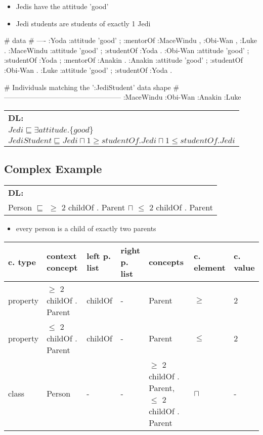 \documentclass{llncs}
\newenvironment{gcotable}{
  \scriptsize
  \sffamily
  \vspace{0.3cm}
  \begin{tabular}{l|l|l|l|l|l|l}
  \hline
  \textbf{c. type} & \textbf{context concept} & \textbf{left p. list} & \textbf{right p. list} & \textbf{concepts} & \textbf{c. element} & \textbf{c. value} \\
  \hline

}{
  \hline
  \end{tabular}
  \linebreak
}
\newenvironment{DL}{
  \scriptsize
  \sffamily
  \vspace{0.3cm}
  \begin{tabular}{l}
	\textbf{DL:} \\

}{
  \end{tabular}
  \linebreak
}
\newcommand{\tb}[1]{\todo[size=\small, color=blue!40]{\textbf{Thomas:} #1}}
\begin{document}
\begin{itemize}
	\item Jedis have the attitude 'good'
	\item Jedi students are students of exactly 1 Jedi
\end{itemize}

\begin{ex}
# data
# ----
:Yoda 
    :attitude 'good' ;
    :mentorOf :MaceWindu , :Obi-Wan , :Luke .
:MaceWindu
    :attitude 'good' ;
    :studentOf :Yoda .
:Obi-Wan 
    :attitude 'good' ;
    :studentOf :Yoda ;
    :mentorOf :Anakin .
:Anakin
    :attitude 'good' ; 
    :studentOf :Obi-Wan .
:Luke
    :attitude 'good' ;
    :studentOf :Yoda .
\end{ex}

\begin{ex}
# Individuals matching the ’:JediStudent’ data shape
# --------------------------------------------------
:MaceWindu :Obi-Wan :Anakin :Luke
\end{ex}



\begin{DL}
$Jedi \sqsubseteq \exists attitude.\{good\} $\\
$JediStudent \sqsubseteq Jedi \sqcap 1\geq studentOf.Jedi \sqcap 1\leq studentOf.Jedi$ \\
\end{DL}

\subsection{Complex Example}

\begin{DL}
Person $\sqsubseteq$ $\geq$ 2 childOf . Parent $\sqcap$ $\leq$  2 childOf . Parent \\
\end{DL}


\begin{itemize}
	\item every person is a child of exactly two parents
\end{itemize}

\begin{gcotable}
property & $\geq$ 2 childOf . Parent & childOf & - & Parent & $\geq$ & 2 \\
property & $\leq$ 2 childOf . Parent & childOf & - & Parent & $\leq$ & 2 \\
class & Person & - & - & $\geq$ 2 childOf . Parent, $\leq$ 2 childOf . Parent & $\sqcap$ & - \\
\end{gcotable}
\end{document}

